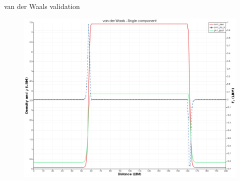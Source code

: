 \documentclass[8pt]{beamer}
\begin{document}
	\begin{frame}{van der Waals validation}
		\begin{figure}
			\includegraphics[scale=0.2]{pics/vdwValidation.png}
		\end{figure}
	\end{frame}
\end{document}
